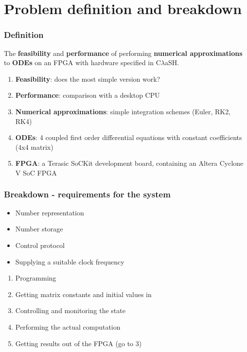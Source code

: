 \documentclass{beamer}[10]
\newcommand{\clash}{C$\lambda$aSH}
\begin{document}
\section{Problem definition and breakdown}
\begin{frame}
	\frametitle{Definition}
	
	The \textbf{feasibility} and \textbf{performance} of performing \textbf{numerical approximations} to \textbf{ODEs} on an FPGA with hardware specified in \clash{}.
	
	\begin{enumerate}
		\item \textbf{Feasibility}: does the most simple version work?
		\item \textbf{Performance}: comparison with a desktop CPU
		\item \textbf{Numerical approximations}: simple integration schemes (Euler, RK2, RK4)
		\item \textbf{ODEs}: 4 coupled first order differential equations with constant coefficients (4x4 matrix)
		\item \textbf{FPGA}: a Terasic SoCKit development board, containing an Altera Cyclone V SoC FPGA
	\end{enumerate}
\end{frame}

\begin{frame}
	\frametitle{Breakdown - requirements for the system}
	
	\begin{itemize}
		\item Number representation
		\item Number storage
		\item Control protocol
		\item Supplying a suitable clock frequency	
	\end{itemize}
		
	\begin{enumerate}
		\item Programming
		\item Getting matrix constants and initial values in
		\item Controlling and monitoring the state
		\item Performing the actual computation
		\item Getting results out of the FPGA (go to 3)
	\end{enumerate}
	
\end{frame}
\end{document}
